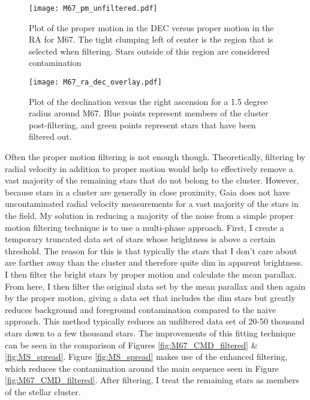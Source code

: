 \documentclass[aps,prb,twocolumn,groupedaddress,nofootinbib,floatfix]{revtex4-1}
\begin{document}
\begin{figure}[!h]
	\centering
      \texttt{[image: M67\_pm\_unfiltered.pdf]}
	\caption{Plot of the proper motion in the DEC versus proper motion in the RA for M67. The tight clumping left of center is the region that is selected when filtering. Stars outside of this region are considered contamination}
	\label{fig:M67_pos}
\end{figure}


\begin{figure}[!h]
	\centering
      \texttt{[image: M67\_ra\_dec\_overlay.pdf]}
	\caption{Plot of the declination versus the right ascension for a 1.5 degree radius around M67. Blue points represent members of the cluster post-filtering, and green points represent stars that have been filtered out.}
	\label{fig:M67_pos}
\end{figure}

Often the proper motion filtering is not enough though. Theoretically, filtering by radial velocity in addition to proper motion would help to effectively remove a vast majority of the remaining stars that do not belong to the cluster. However, because stars in a cluster are generally in close proximity, Gaia does not have uncontaminated radial velocity measurements for a vast majority of the stars in the field. My solution in reducing a majority of the noise from a simple proper motion filtering technique is to use a multi-phase approach. First, I create a temporary truncated data set of stars whose brightness is above a certain threshold. The reason for this is that typically the stars that I don't care about are farther away than the cluster and therefore quite dim in apparent brightness. I then filter the bright stars by proper motion and calculate the mean parallax. From here, I then filter the original data set by the mean parallax and then again by the proper motion, giving a data set that includes the dim stars but greatly reduces background and foreground contamination compared to the naive approach. This method typically reduces an unfiltered data set of 20-50 thousand stars down to a few thousand stars. The improvements of this fitting technique can be seen in the comparison of Figures \ref{fig:M67_CMD_filtered} \& \ref{fig:MS_spread}. Figure \ref{fig:MS_spread} makes use of the enhanced filtering, which reduces the contamination around the main sequence seen in Figure \ref{fig:M67_CMD_filtered}. After filtering, I treat the remaining stars as members of the stellar cluster.
\end{document}
